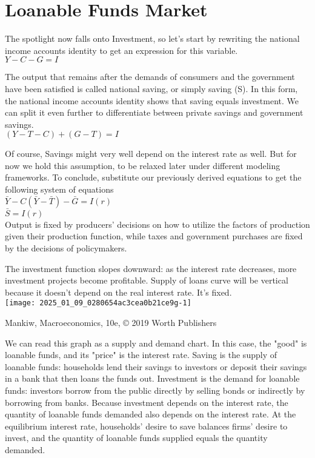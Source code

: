\documentclass[10pt]{article}
\begin{document}
\section*{Loanable Funds Market}
The spotlight now falls onto Investment, so let's start by rewriting the national income accounts identity to get an expression for this variable.\\
$Y-C-G=I$

The output that remains after the demands of consumers and the government have been satisfied is called national saving, or simply saving (S). In this form, the national income accounts identity shows that saving equals investment. We can split it even further to differentiate between private savings and government savings.\\
$(Y-T-C)+(G-T)=I$

Of course, Savings might very well depend on the interest rate as well. But for now we hold this assumption, to be relaxed later under different modeling frameworks. To conclude, substitute our previously derived equations to get the following system of equations\\
$\bar{Y}-C(\bar{Y}-\bar{T})-\bar{G}=I(r)$\\
$\bar{S}=I(r)$\\
Output is fixed by producers' decisions on how to utilize the factors of production given their production function, while taxes and government purchases are fixed by the decisions of policymakers.

The investment function slopes downward: as the interest rate decreases, more investment projects become profitable. Supply of loans curve will be vertical because it doesn't depend on the real interest rate. It's fixed.\\
\texttt{[image: 2025\_01\_09\_0280654ac3cea0b21ce9g-1]}

Mankiw, Macroeconomics, 10e, © 2019 Worth Publishers

We can read this graph as a supply and demand chart. In this case, the "good" is loanable funds, and its "price" is the interest rate. Saving is the supply of loanable funds: households lend their savings to investors or deposit their savings in a bank that then loans the funds out. Investment is the demand for loanable funds: investors borrow from the public directly by selling bonds or indirectly by borrowing from banks. Because investment depends on the interest rate, the quantity of loanable funds demanded also depends on the interest rate. At the equilibrium interest rate, households' desire to save balances firms' desire to invest, and the quantity of loanable funds supplied equals the quantity demanded.
\end{document}

